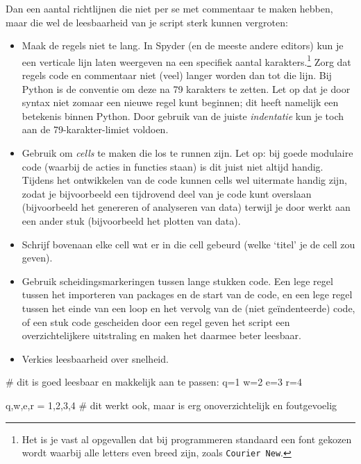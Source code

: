 \documentclass[a4paper,11pt, fleqn]{article}
\begin{document}
Dan een aantal richtlijnen die niet per se met commentaar te maken hebben, maar die wel de leesbaarheid van je script sterk kunnen vergroten:
\begin{itemize}
\item Maak de regels niet te lang. In Spyder (en de meeste andere editors) kun je een verticale lijn laten weergeven na een specifiek aantal karakters.\footnote{Het is je vast al opgevallen dat bij programmeren standaard een font gekozen wordt waarbij alle letters even breed zijn, zoals \texttt{Courier New}.} Zorg dat regels code en commentaar niet (veel) langer worden dan tot die lijn. Bij Python is de conventie om deze na 79 karakters te zetten. Let op dat je door syntax niet zomaar een nieuwe regel kunt beginnen; dit heeft namelijk een betekenis binnen Python. Door gebruik van de juiste \textit{indentatie} kun je toch aan de 79-karakter-limiet voldoen.
\item Gebruik \pythoninline{#\%\%} om \textit{cells} te maken die los te runnen zijn. Let op: bij goede modulaire code (waarbij de acties in functies staan) is dit juist niet altijd handig. Tijdens het ontwikkelen van de code kunnen cells wel uitermate handig zijn, zodat je bijvoorbeeld een tijdrovend deel van je code kunt overslaan (bijvoorbeeld het genereren of analyseren van data) terwijl je door werkt aan een ander stuk (bijvoorbeeld het plotten van data).
\item Schrijf bovenaan elke cell wat er in die cell gebeurd (welke `titel' je de cell zou geven).
\item Gebruik scheidingsmarkeringen tussen lange stukken code. Een lege regel tussen het importeren van packages en de start van de code, en een lege regel tussen het einde van een loop en het vervolg van de (niet ge\"indenteerde) code, of een stuk code gescheiden door een regel \pythoninline{#---------} geven het script een overzichtelijkere uitstraling en maken het daarmee beter leesbaar.
\item Verkies leesbaarheid over snelheid.
\end{itemize}
\begin{python}
# dit is goed leesbaar en makkelijk aan te passen:
q=1
w=2
e=3
r=4

q,w,e,r = 1,2,3,4 # dit werkt ook, maar is erg onoverzichtelijk en foutgevoelig
\end{python}
\end{document}
